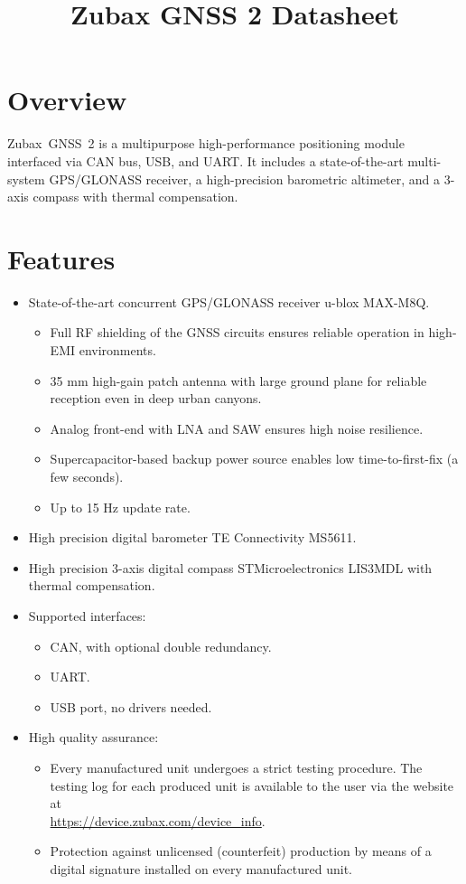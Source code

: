 \documentclass{zubaxdoc}
\title{Zubax GNSS 2 Datasheet}
\begin{document}
\frontmatter

\begin{titlepage}

\section*{Overview}

Zubax~GNSS~2 is a multipurpose high-performance positioning module interfaced via CAN bus, USB, and UART.
It includes a state-of-the-art multi-system GPS/\allowbreak{}GLONASS receiver,
a high-precision barometric altimeter, and a 3-axis compass with thermal compensation.

\section*{Features}

\begin{itemize}
    \item State-of-the-art concurrent GPS/GLONASS receiver u-blox MAX-M8Q.
    \begin{itemize}
    	\item Full RF shielding of the GNSS circuits ensures reliable operation in high-EMI environments.
    	\item 35 mm high-gain patch antenna with large ground plane for reliable reception even in deep urban canyons.
    	\item Analog front-end with LNA and SAW ensures high noise resilience.
    	\item Supercapacitor-based backup power source enables low time-to-first-fix (a few seconds).
    	\item Up to 15 Hz update rate.
    \end{itemize}
	\item High precision digital barometer TE Connectivity MS5611.
    \item High precision 3-axis digital compass STMicroelectronics LIS3MDL with thermal compensation.
	\item Supported interfaces:
    \begin{itemize}
        \item CAN, with optional double redundancy.
        \item UART.
        \item USB port, no drivers needed.
    \end{itemize}
    \item High quality assurance:
    \begin{itemize}
        \item Every manufactured unit undergoes a strict testing procedure.
        The testing log for each produced unit is available to the user via the website at\\
        \url{https://device.zubax.com/device_info}.
        \item Protection against unlicensed (counterfeit) production by means of a digital signature
        installed on every manufactured unit.
    \end{itemize}
\end{itemize}


\end{titlepage}
\end{document}
